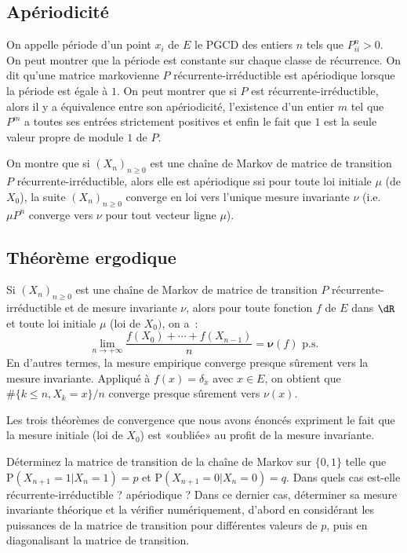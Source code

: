 {{%
\subsection{Apériodicité}
%

On appelle période d'un point $x_i$ de $E$ le PGCD des entiers $n$ tels que
$P^n_{ii}>0$. On peut montrer que la période est constante sur chaque classe
de récurrence. On dit qu'une matrice markovienne $P$ récurrente-irréductible
est apériodique lorsque la période est égale à $1$. On peut montrer que si $P$
est récurrente-irréductible, alors il y a équivalence entre son apériodicité,
l'existence d'un entier $m$ tel que $P^m$ a toutes ses entrées strictement
positives et enfin le fait que $1$ est la seule valeur propre de module $1$ de
$P$.

On montre que si $(X_n)_{n\geq 0}$ est une chaîne de Markov de matrice de
transition $P$ récurrente-irréductible, alors elle est apériodique ssi pour
toute loi initiale $\mu$ (de $X_0$), la suite $(X_n)_{n\geq 0}$ converge en
loi vers l'unique mesure invariante $\nu$ (i.e. $\mu P^n$ converge vers $\nu$
pour tout vecteur ligne $\mu$).


%
\subsection{Théorème ergodique}
%

Si $(X_n)_{n\geq 0}$ est une chaîne de Markov de matrice de transition $P$
récurrente-irréductible et de mesure invariante $\nu$, alors pour toute
fonction $f$ de $E$ dans $\dR$ et toute loi initiale $\mu$ (loi de $X_0)$, on
a~:
$$
\lim_{n\to+\infty} \frac{f(X_0) + \cdots + f(X_{n-1})}{n} =
\mathbf{\nu}(f) \text{ p.s.}
$$
En d'autres termes, la mesure empirique converge presque sûrement vers la
mesure invariante. Appliqué à $f(x)=\delta_{x}$ avec $x\in E$, on obtient que
$\#\{k\leq n, X_k = x\}/n$ converge presque sûrement vers $\nu(x)$.

Les trois théorèmes de convergence que nous avons énoncés expriment le fait
que la mesure initiale (loi de $X_0$) est «oubliée» au profit de la mesure
invariante.


\begin{exo}
  Déterminez la matrice de transition de la chaîne de Markov sur $\{0,1\}$ telle
  que $\mathrm{P}(X_{n+1}=1\vert X_n=1)=p$ et $\mathrm{P}(X_{n+1}=0\vert
  X_n=0)=q$. Dans quels cas est-elle récurrente-irréductible ? apériodique ?
  Dans ce dernier cas, déterminer sa mesure invariante théorique et la
  vérifier numériquement, d'abord en considérant les puissances de la matrice
  de transition pour différentes valeurs de $p$, puis en diagonalisant la
  matrice de transition.
\end{exo}

}}

